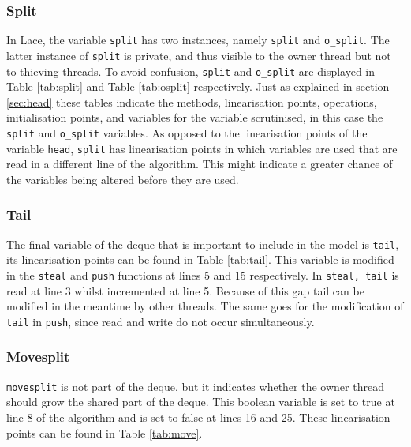 \documentclass{sig-alternate-br}
\begin{document}
\subsubsection{Split}
In Lace, the variable \texttt{split} has two instances, namely \texttt{split} and \texttt{o\_split}.
The latter instance of \texttt{split} is private, and thus visible to the owner thread but not to thieving threads.
To avoid confusion, \texttt{split} and \texttt{o\_split} are displayed in Table \ref{tab:split} and Table \ref{tab:osplit} respectively.
Just as explained in section \ref{sec:head} these tables indicate the methods, linearisation points, operations, initialisation points, and variables for the variable scrutinised, in this case the \texttt{split} and \texttt{o\_split} variables.
As opposed to the linearisation points of the variable \texttt{head}, \texttt{split} has linearisation points in which variables are used that are read in a different line of the algorithm.
This might indicate a greater chance of the variables being altered before they are used.

\subsubsection{Tail}
The final variable of the deque that is important to include in the model is \texttt{tail}, its linearisation points can be found in Table \ref{tab:tail}.
This variable is modified in the \texttt{steal} and \texttt{push} functions at lines 5 and 15 respectively.
In \texttt{steal, tail} is read at line 3 whilst incremented at line 5.
Because of this gap tail can be modified in the meantime by other threads.
The same goes for the modification of \texttt{tail} in \texttt{push}, since read and write do not occur simultaneously.

\subsubsection{Movesplit}
\texttt{movesplit} is not part of the deque, but it indicates whether the owner thread should grow the shared part of the deque.
This boolean variable is set to true at line 8 of the algorithm and is set to false at lines 16 and 25.
These linearisation points can be found in Table \ref{tab:move}.
\end{document}
